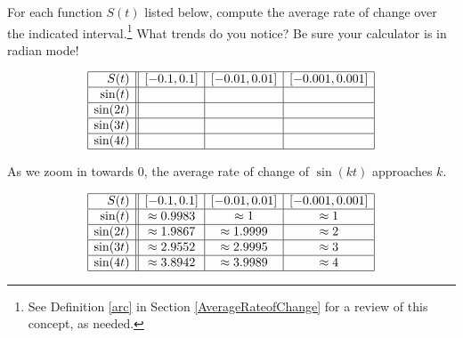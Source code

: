 \documentclass{ximera}
\begin{document}
\begin{problem}\label{sinearcexercise}


For each function $S(t)$ listed below, compute the average rate of change over the indicated interval.\footnote{See Definition \ref{arc} in Section \ref{AverageRateofChange} for a review of this concept, as needed.}  What trends do you notice? Be sure your calculator is in radian mode!

\[ \begin{array}{|r||c|c|c|}  \hline

 S(t) &  [-0.1, 0.1] & [-0.01, 0.01] &[-0.001, 0.001] \\ \hline
 \sin(t)     &&&  \\  \hline
 \sin(2t)   &&&  \\ \hline
 \sin(3t)   &&&   \\  \hline
\sin(4t)   &&&   \\  \hline

\end{array} \]

\begin{solution}

As we zoom in towards $0$, the average rate of change of $\sin(k t)$ approaches $k$.

\[ \begin{array}{|r||c|c|c|}  \hline

 S(t) &  [-0.1, 0.1] & [-0.01, 0.01] &[-0.001, 0.001] \\ \hline
 \sin(t)     & \approx 0.9983  &  \approx 1  &  \approx 1 \\  \hline
 \sin(2t)   & \approx 1.9867 & \approx  1.9999 & \approx 2 \\ \hline
 \sin(3t)   & \approx 2.9552 & \approx 2.9995 &  \approx 3  \\  \hline
 \sin(4t)  & \approx 3.8942 & \approx 3.9989 &  \approx 4 \\  \hline

\end{array} \]

\end{solution}

\end{problem}
\end{document}
